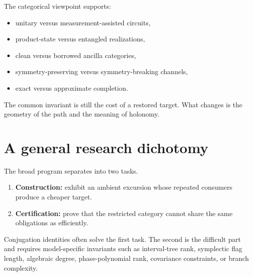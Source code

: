 The categorical viewpoint supports:
\begin{itemize}
\item unitary versus measurement-assisted circuits,
\item product-state versus entangled realizations,
\item clean versus borrowed ancilla categories,
\item symmetry-preserving versus symmetry-breaking channels,
\item exact versus approximate completion.
\end{itemize}
The common invariant is still the cost of a restored target.  What changes is the geometry of the path and the meaning of holonomy.

\section{A general research dichotomy}
The broad program separates into two tasks.
\begin{enumerate}
\item \textbf{Construction:} exhibit an ambient excursion whose repeated consumers produce a cheaper target.
\item \textbf{Certification:} prove that the restricted category cannot share the same obligations as efficiently.
\end{enumerate}
Conjugation identities often solve the first task.  The second is the difficult part and requires model-specific invariants such as interval-tree rank, symplectic flag length, algebraic degree, phase-polynomial rank, covariance constraints, or branch complexity.
